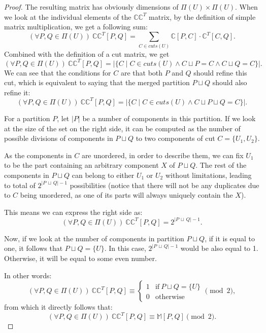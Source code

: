 \documentclass[thesis=M,english,hidelinks]{FITthesis}[2012/10/20]
\theoremstyle{definition}
\begin{document}
\begin{proof}
    The resulting matrix has obviously dimensions of $\Pi(U) \times \Pi(U)$. When we look at the individual elements of
    the $\mathbb{C}\mathbb{C}^T$ matrix, by the definition of simple matrix multiplication, we get a following sum:
    $$
    (\forall P, Q \in \Pi(U))\ \mathbb{C}\mathbb{C}^T [P, Q] = \sum_{C \in cuts(U)} \mathbb{C}[P, C] \cdot
    \mathbb{C}^T[C, Q].
    $$
    Combined with the definition of a cut matrix, we get
    $$
    (\forall P, Q \in \Pi(U))\ \mathbb{C}\mathbb{C}^T [P, Q] = \lvert \{ C \mid C \in cuts(U) \land C \sqcup P = C
    \land C \sqcup Q = C \} \rvert.
    $$
    We can see that the conditions for $C$ are that both $P$ and $Q$ should refine this cut, which is equivalent to
    saying that the merged partition $P \sqcup Q$ should also refine it:
    $$
    (\forall P, Q \in \Pi(U))\ \mathbb{C}\mathbb{C}^T [P, Q] = \lvert \{ C \mid C \in cuts(U) \land C \sqcup P \sqcup
    Q = C \} \rvert.
    $$

    For a partition $P$, let $|P|$ be a number of components in this partition. If we look at the size of the set on the
    right side, it can be computed as the number of possible divisions of components in $P \sqcup Q$ to two components
    of cut $C = \{U_1, U_2\}$.
    
    As the components in $C$ are unordered, in order to describe them, we can fix $U_1$ to be the part containing an
    arbitrary component $X$ of $P \sqcup Q$. The rest of the components in $P \sqcup Q$ can belong to either $U_1$ or
    $U_2$ without limitations, leading to total of $2^{\lvert P\,\sqcup\,Q \rvert-1}$ possibilities (notice that there
    will not be any duplicates due to $C$ being unordered, as one of its parts will always uniquely contain the $X$).

    This means we can express the right side as:
    $$
    (\forall P, Q \in \Pi(U))\ \mathbb{C}\mathbb{C}^T [P, Q] = 2^{\lvert P\,\sqcup\,Q \rvert-1}.
    $$

    Now, if we look at the number of components in partition $P \sqcup Q$, if it is equal to one, it follows that $P
    \sqcup Q = \{U\}$. In this case, $2^{\lvert P\,\sqcup\,Q \rvert-1}$ would be also equal to 1. Otherwise, it will be
    equal to some even number.

    In other words:
    $$
    (\forall P, Q \in \Pi(U))\ \mathbb{C}\mathbb{C}^T [P, Q] \equiv
    \begin{cases}
        1 & \text{if}\ P \sqcup Q = \{U\} \\
        0 & \text{otherwise}
    \end{cases}
    \pmod{2},
    $$
    from which it directly follows that:
    $$
    (\forall P, Q \in \Pi(U))\ \mathbb{C}\mathbb{C}^T [P, Q] \equiv \mathbb{M}[P, Q] \pmod{2}.
    $$
\end{proof}
\end{document}
